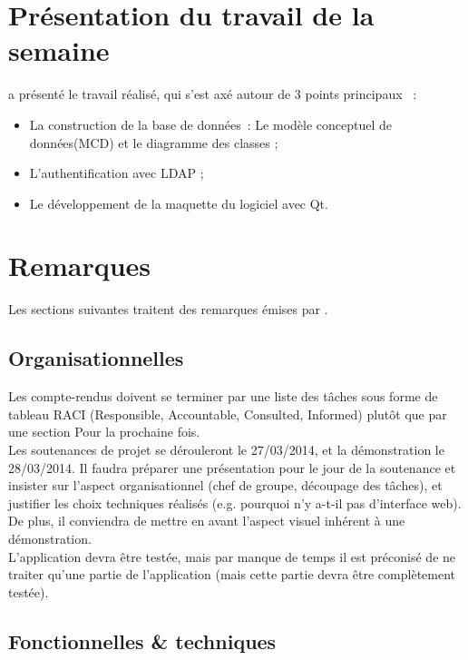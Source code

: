 \documentclass[11pt,fleqn]{report}
\begin{document}
\section{Présentation du travail de la semaine}
\amo a présenté le travail réalisé, qui s'est axé autour de 3 points principaux ~:
\begin{itemize}
	\item  La construction de la base de données~: Le modèle conceptuel de données(MCD) et le diagramme des classes ;
	\item L'authentification avec LDAP ;
	\item Le développement  de la maquette du logiciel avec Qt.
\end{itemize} 

\section{Remarques}

Les sections suivantes traitent des remarques émises par \mo.

\subsection{Organisationnelles}
Les compte-rendus doivent se terminer par une liste des tâches sous forme de tableau RACI (Responsible, Accountable, Consulted, Informed) plutôt que par une section \og{}Pour la prochaine fois\fg{}.\\
Les soutenances de projet se dérouleront le 27/03/2014, et la démonstration le 28/03/2014. Il faudra préparer une présentation pour le jour de la soutenance et insister sur l'aspect organisationnel (chef de groupe, découpage des tâches), et justifier les choix techniques réalisés (e.g. pourquoi n'y a-t-il pas d'interface web).
De plus, il conviendra de mettre en avant l'aspect visuel inhérent à une démonstration.
\\
L'application devra être testée, mais par manque de temps il est préconisé de ne traiter qu'une partie de l'application (mais cette partie devra être complètement testée).

\subsection{Fonctionnelles \& techniques}
\end{document}
